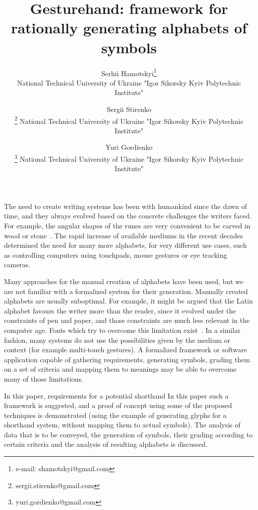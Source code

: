 \documentclass{vgtc}                          %
\title{Gesturehand: framework for rationally generating alphabets of symbols}
\author{Serhii Hamotskyi\thanks{e-mail: shamotskyi@gmail.com}\\ %
        \scriptsize National Technical University of Ukraine "Igor Sikorsky Kyiv Polytechnic Institute"\\
\and Sergii Stirenko\\
        \thanks{sergii.stirenko@gmail.com}
        \scriptsize National Technical University of Ukraine "Igor Sikorsky Kyiv Polytechnic Institute"\\
\and Yuri Gordienko\\
        \thanks{yuri.gordienko@gmail.com}
        \scriptsize National Technical University of Ukraine "Igor Sikorsky Kyiv Polytechnic Institute"}
\begin{document}


\maketitle


The need to create writing systems has been with humankind since the dawn of time, and they always evolved based on the concrete challenges the writers faced. For example, the angular shapes of the runes are very convenient to be carved in wood or stone~\cite{williams1996origin}. The rapid increase of available mediums in the recent decades determined the need for many more alphabets, for very different use cases, such as controlling computers using touchpads, mouse gestures or eye tracking cameras.

Many approaches for the manual creation of alphabets have been used, but we are not familiar with a formalized system for their generation. Manually created alphabets are usually suboptimal. For example, it might be argued that the Latin alphabet favours the writer more than the
reader, since it evolved under the constraints of pen and paper, and those constraints are much less relevant in the computer age. Fonts which try to overcome this limitation exist~\cite{dotsies}. In a similar fashion, many systems do not use the possibilities given by the medium or context (for example multi-touch gestures). A formalized framework or software application capable of gathering requirements, generating symbols, grading them on a set of criteria and mapping them to meanings may be able to overcome many of those limitations.

In this paper, requirements for a potential shorthand
In this paper such a framework is suggested, and a proof of concept using some of the proposed techniques is demonstrated (using the example of generating glyphs for a shorthand system, without mapping them to actual symbols). The analysis of data that is to be conveyed, the generation of symbols, their grading according to certain criteria and the analysis of resulting alphabets is discussed.
\end{document}
